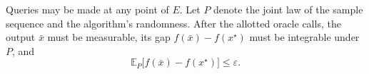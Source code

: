 \documentclass[10pt]{article}
\theoremstyle{definition}
\begin{document}
Queries may be made at any point of $E$. Let $P$ denote the joint law of the sample sequence and the algorithm's randomness. After the allotted oracle calls, the output $\bar{x}$ must be measurable, its gap $f(\bar{x})-f(x^\star)$ must be integrable under $P$, and
\[
\mathbb{E}_{P}\bigl[f(\bar{x})-f(x^\star)\bigr]\leq\varepsilon.
\]
\end{document}
